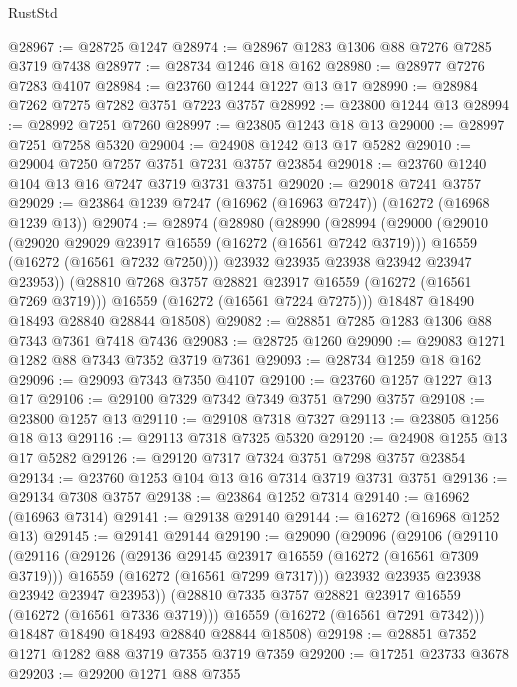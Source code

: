 \begin{lexlean}{RustStd}
\begin{coremodule}
@28967 := @28725 @1247
@28974 := @28967 @1283 @1306 @88 @7276 @7285 @3719 @7438
@28977 := @28734 @1246 @18 @162
@28980 := @28977 @7276 @7283 @4107
@28984 := @23760 @1244 @1227 @13 @17
@28990 := @28984 @7262 @7275 @7282 @3751 @7223 @3757
@28992 := @23800 @1244 @13
@28994 := @28992 @7251 @7260
@28997 := @23805 @1243 @18 @13
@29000 := @28997 @7251 @7258 @5320
@29004 := @24908 @1242 @13 @17 @5282
@29010 := @29004 @7250 @7257 @3751 @7231 @3757 @23854
@29018 := @23760 @1240 @104 @13 @16 @7247 @3719 @3731 @3751
@29020 := @29018 @7241 @3757
@29029 := @23864 @1239 @7247 (@16962 (@16963 @7247)) (@16272 (@16968 @1239 @13))
@29074 := @28974
    (@28980
      (@28990
        (@28994
          (@29000
            (@29010
              (@29020 @29029 @23917 @16559 (@16272 (@16561 @7242 @3719)))
              @16559
              (@16272 (@16561 @7232 @7250)))
            @23932
            @23935
            @23938
            @23942
            @23947
            @23953))
        (@28810 @7268 @3757 @28821 @23917 @16559 (@16272 (@16561 @7269 @3719)))
        @16559
        (@16272 (@16561 @7224 @7275)))
      @18487
      @18490
      @18493
      @28840
      @28844
      @18508)
@29082 := @28851 @7285 @1283 @1306 @88 @7343 @7361 @7418 @7436
@29083 := @28725 @1260
@29090 := @29083 @1271 @1282 @88 @7343 @7352 @3719 @7361
@29093 := @28734 @1259 @18 @162
@29096 := @29093 @7343 @7350 @4107
@29100 := @23760 @1257 @1227 @13 @17
@29106 := @29100 @7329 @7342 @7349 @3751 @7290 @3757
@29108 := @23800 @1257 @13
@29110 := @29108 @7318 @7327
@29113 := @23805 @1256 @18 @13
@29116 := @29113 @7318 @7325 @5320
@29120 := @24908 @1255 @13 @17 @5282
@29126 := @29120 @7317 @7324 @3751 @7298 @3757 @23854
@29134 := @23760 @1253 @104 @13 @16 @7314 @3719 @3731 @3751
@29136 := @29134 @7308 @3757
@29138 := @23864 @1252 @7314
@29140 := @16962 (@16963 @7314)
@29141 := @29138 @29140
@29144 := @16272 (@16968 @1252 @13)
@29145 := @29141 @29144
@29190 := @29090
    (@29096
      (@29106
        (@29110
          (@29116
            (@29126
              (@29136 @29145 @23917 @16559 (@16272 (@16561 @7309 @3719)))
              @16559
              (@16272 (@16561 @7299 @7317)))
            @23932
            @23935
            @23938
            @23942
            @23947
            @23953))
        (@28810 @7335 @3757 @28821 @23917 @16559 (@16272 (@16561 @7336 @3719)))
        @16559
        (@16272 (@16561 @7291 @7342)))
      @18487
      @18490
      @18493
      @28840
      @28844
      @18508)
@29198 := @28851 @7352 @1271 @1282 @88 @3719 @7355 @3719 @7359
@29200 := @17251 @23733 @3678
@29203 := @29200 @1271 @88 @7355

\end{coremodule}
\end{lexlean}
